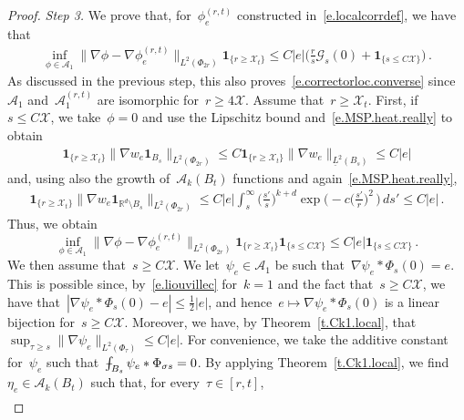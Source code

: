 \documentclass[11pt,twoside]{article} %
\numberwithin{equation}{section}
\theoremstyle{definition}
\newcommand*{\R}{\ensuremath{\mathbb{R}}}
\newcommand{\X}{\mathcal{X}}
\newcommand{\indc}{\boldsymbol{1}}
\def\Xint#1{\mathchoice
{\XXint\displaystyle\textstyle{#1}}%
{\XXint\textstyle\scriptstyle{#1}}%
{\XXint\scriptstyle\scriptscriptstyle{#1}}%
{\XXint\scriptscriptstyle\scriptscriptstyle{#1}}%
\!\int}
\def\XXint#1#2#3{{\setbox0=\hbox{$#1{#2#3}{\int}$}
\vcenter{\hbox{$#2#3$}}\kern-.5\wd0}}
\def\fint{\Xint-}
\newcommand{\A}{\mathcal{A}}
\begin{document}
\begin{proof}
\emph{Step 3.} We prove that,  for~$\phi_{e}^{(r,t)}$ constructed in~\eqref{e.localcorrdef}, we have that 
\begin{align}  \label{e.correctorloc}
\inf_{\phi \in \A_1 }
\big\| \nabla \phi - \nabla \phi_{e}^{(r,t)}\big\|_{L^2(\Phi_{2r})}
\indc_{\{ r \geq \X_t \}} %
\leq 
C |e| 
\biggl( 
 \frac{r}{s} \mathcal{G}_{s}(0) 
+
 \indc_{\{ s \leq C \X \}}
\biggr) 
\,.
\end{align}
As discussed in the previous step, this also proves~\eqref{e.correctorloc.converse} since~$\A_1$ and~$\A_1^{(r,t)}$ are isomorphic for~$r\geq 4\X$.  Assume that~$r \geq  \X_t$. First, if~$s\leq C \X$, we take~$\phi = 0$ and use the Lipschitz bound and~\eqref{e.MSP.heat.really} to obtain 
\begin{align*}  
\indc_{\{ r \geq \X_t \}} \big\| \nabla w_{e} \indc_{B_s} \big\|_{L^2(\Phi_{2r})} 
\leq 
C \indc_{\{ r \geq \X_t \}} \big\| \nabla w_{e}  \big\|_{\underline{L}^2(B_s)} 
\leq
C |e| 
\end{align*}
and, using also the growth of~$\A_k(B_t)$ functions and again~\eqref{e.MSP.heat.really}, 
\begin{align*}  
\indc_{\{ r \geq \X_t \}} \big\| \nabla w_{e}  \indc_{\R^d \setminus B_s} \big\|_{L^2(\Phi_{2r})} 
\leq 
C |e| \int_{s}^\infty \biggl(\frac{s'}{s} \biggr)^{\!\!k+d} \exp\biggl( - c  \biggl( \frac{s'}{r} \biggr)^{\!\!2} \, \biggr) \, ds'  
\leq 
C|e| 
\,.
\end{align*}
Thus, we obtain 
\begin{equation*}  
\inf_{\phi \in \A_1 }
\big\| \nabla \phi - \nabla \phi_{e}^{(r,t)}\big\|_{L^2(\Phi_{2r})}
\indc_{\{ r \geq \X_t \}} \indc_{\{ s \leq C \X \}} 
\leq 
C |e|
\indc_{\{ s \leq C \X \}} 
\,.
\end{equation*}
We then assume that~$s\geq C\X$. We let~$\psi_e \in \A_1$ be such that~$\nabla \psi_e \ast  \Phi_s (0)  = e$. This is possible since, by~\eqref{e.liouvillec} for~$k=1$ and the fact that~$s \geq C\X$, we have that~$|\nabla \psi_e \ast  \Phi_s (0) - e| \leq \frac12 |e|$, and hence~$e \mapsto \nabla \psi_e \ast  \Phi_s (0)$ is a linear bijection for~$s\geq C\X$. Moreover, we have, by Theorem~\ref{t.Ck1.local}, that~$\sup_{\tau \geq s} \| \nabla \psi_e \|_{L^2(\Phi_\tau)} \leq C|e|$. For convenience, we take the additive constant for~$\psi_e$ such that~$\fint_{B_s} \psi_e\ast \Phi_{\sigma s} = 0$. By applying Theorem~\ref{t.Ck1.local}, 
we find~$\eta_e \in  \A_{k}(B_t)$ such that, for every~$\tau  \in [r,t]$, 
\begin{align} \label{e.loc.corrclose2}

\end{align}
\end{proof}
\end{document}
